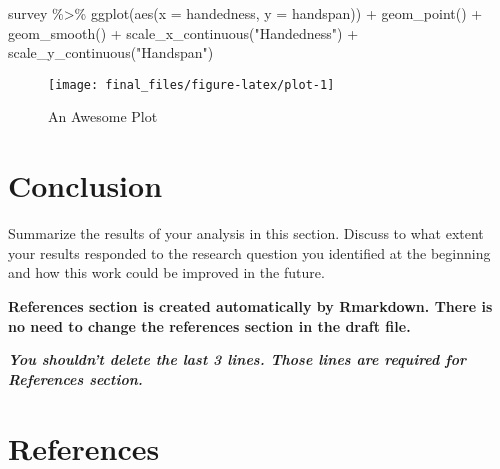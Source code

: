 \documentclass[
  12pt,
]{article}
\newenvironment{Shaded}{\begin{snugshade}}{\end{snugshade}}
\newcommand{\AttributeTok}[1]{\textcolor[rgb]{0.77,0.63,0.00}{#1}}
\newcommand{\FunctionTok}[1]{\textcolor[rgb]{0.00,0.00,0.00}{#1}}
\newcommand{\NormalTok}[1]{#1}
\newcommand{\SpecialCharTok}[1]{\textcolor[rgb]{0.00,0.00,0.00}{#1}}
\newcommand{\StringTok}[1]{\textcolor[rgb]{0.31,0.60,0.02}{#1}}
\begin{document}
\begin{Shaded}
\begin{Highlighting}[]
\NormalTok{survey }\SpecialCharTok{\%\textgreater{}\%} 
  \FunctionTok{ggplot}\NormalTok{(}\FunctionTok{aes}\NormalTok{(}\AttributeTok{x =}\NormalTok{ handedness, }\AttributeTok{y =}\NormalTok{ handspan)) }\SpecialCharTok{+}
  \FunctionTok{geom\_point}\NormalTok{() }\SpecialCharTok{+}
  \FunctionTok{geom\_smooth}\NormalTok{() }\SpecialCharTok{+}
  \FunctionTok{scale\_x\_continuous}\NormalTok{(}\StringTok{"Handedness"}\NormalTok{) }\SpecialCharTok{+} 
  \FunctionTok{scale\_y\_continuous}\NormalTok{(}\StringTok{"Handspan"}\NormalTok{)}
\end{Highlighting}
\end{Shaded}

\begin{figure}

{\centering \texttt{[image: final\_files/figure-latex/plot-1]} 

}

\caption{An Awesome Plot}\label{fig:plot}
\end{figure}

\hypertarget{conclusion}{%
\section{Conclusion}\label{conclusion}}

Summarize the results of your analysis in this section. Discuss to what extent your results responded to the research question you identified at the beginning and how this work could be improved in the future.

\textbf{References section is created automatically by Rmarkdown. There is no need to change the references section in the draft file.}

\textbf{\emph{You shouldn't delete the last 3 lines. Those lines are required for References section.}}

\newpage

\hypertarget{references}{%
\section{References}\label{references}}
\end{document}
